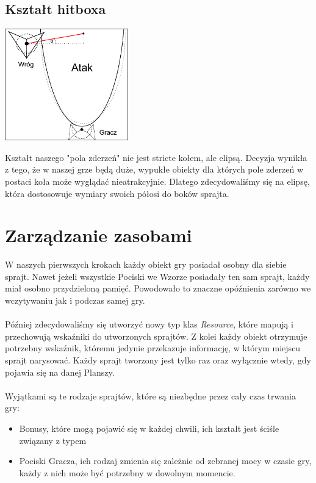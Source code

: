 \documentclass[a4paper,twoside]{article}
\begin{document}
			\subsection{Kształt hitboxa}
				\begin{center}
					\includegraphics[width=0.4\textwidth]{./images/hitbox01}
				\end{center}
				Kształt naszego "pola zderzeń" nie jest stricte kołem, ale elipsą. Decyzja wynikła z tego, że w naszej grze będą duże, wypukłe obiekty dla których pole zderzeń w postaci koła może wyglądać nieatrakcyjnie. Dlatego zdecydowaliśmy się na elipsę, która dostosowuje wymiary swoich półosi do boków sprajta.
	
		\section{Zarządzanie zasobami}
			W naszych pierwszych krokach każdy obiekt gry posiadał osobny dla siebie sprajt. Nawet jeżeli wszystkie Pociski we Wzorze posiadały ten sam sprajt, każdy miał osobno przydzieloną pamięć. Powodowało to znaczne opóźnienia zarówno we wczytywaniu jak i podczas samej gry.\\\\
			Później zdecydowaliśmy się utworzyć nowy typ klas \textit{Resource}, które mapują i przechowują wskaźniki do utworzonych sprajtów. Z kolei każdy obiekt otrzymuje potrzebny wskaźnik, któremu jedynie przekazuje informację, w którym miejscu sprajt narysować. Każdy sprajt tworzony jest tylko raz oraz wyłącznie wtedy, gdy pojawia się na danej Planszy.\\\\
			Wyjątkami są te rodzaje sprajtów, które są niezbędne przez cały czas trwania gry:
			\begin{itemize}
				\item Bonusy, które mogą pojawić się w każdej chwili, ich kształt jest ściśle związany z typem
				\item Pociski Gracza, ich rodzaj zmienia się zależnie od zebranej mocy w czasie gry, każdy z nich może być potrzebny w dowolnym momencie. 
			\end{itemize}
			
\end{document}
